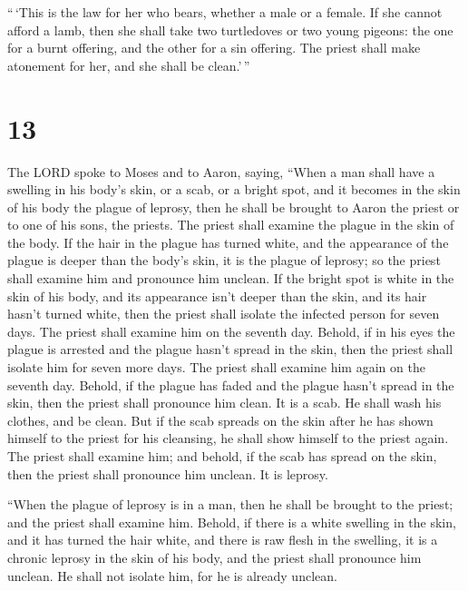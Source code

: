 ``\,`This is the law for her who bears, whether a male or a female.
 If she cannot afford a lamb, then she shall take two
turtledoves or two young pigeons: the one for a burnt offering, and the
other for a sin offering. The priest shall make atonement for her, and
she shall be clean.'\,''

\hypertarget{section-12}{%
\section{13}\label{section-12}}

 The LORD spoke to Moses and to Aaron, saying, 
``When a man shall have a swelling in his body's skin, or a scab, or a
bright spot, and it becomes in the skin of his body the plague of
leprosy, then he shall be brought to Aaron the priest or to one of his
sons, the priests.  The priest shall examine the plague in
the skin of the body. If the hair in the plague has turned white, and
the appearance of the plague is deeper than the body's skin, it is the
plague of leprosy; so the priest shall examine him and pronounce him
unclean.  If the bright spot is white in the skin of his
body, and its appearance isn't deeper than the skin, and its hair hasn't
turned white, then the priest shall isolate the infected person for
seven days.  The priest shall examine him on the seventh
day. Behold, if in his eyes the plague is arrested and the plague hasn't
spread in the skin, then the priest shall isolate him for seven more
days.  The priest shall examine him again on the seventh
day. Behold, if the plague has faded and the plague hasn't spread in the
skin, then the priest shall pronounce him clean. It is a scab. He shall
wash his clothes, and be clean.  But if the scab spreads on
the skin after he has shown himself to the priest for his cleansing, he
shall show himself to the priest again.  The priest shall
examine him; and behold, if the scab has spread on the skin, then the
priest shall pronounce him unclean. It is leprosy.

 ``When the plague of leprosy is in a man, then he shall be
brought to the priest;  and the priest shall examine him.
Behold, if there is a white swelling in the skin, and it has turned the
hair white, and there is raw flesh in the swelling,  it is
a chronic leprosy in the skin of his body, and the priest shall
pronounce him unclean. He shall not isolate him, for he is already
unclean.

